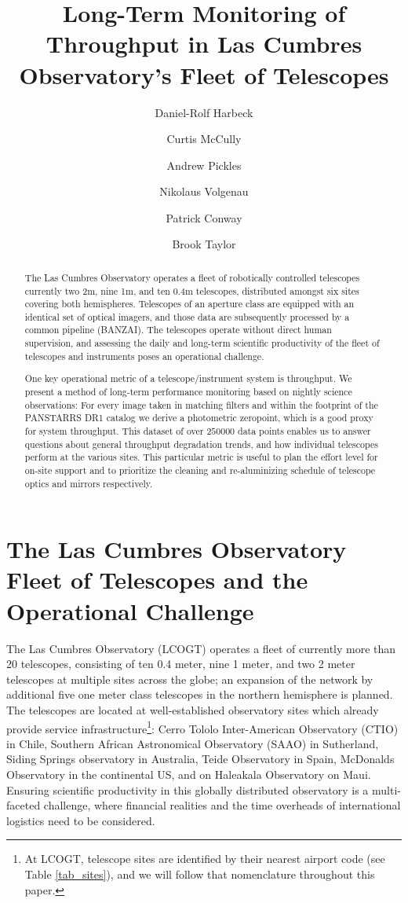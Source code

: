 \documentclass[]{spieman}
\title{Long-Term Monitoring of Throughput in Las Cumbres Observatory's Fleet of Telescopes}
\author[a]{Daniel-Rolf Harbeck}
\author[a]{Curtis McCully}
\author[a]{Andrew Pickles}
\author[a]{Nikolaus Volgenau}
\author[a]{Patrick Conway}
\author[a]{Brook Taylor}
\affil[a] {Las Cumbres Observatory, Goleta, CA (USA)}
\begin{document}
\maketitle

\begin{abstract}
The Las Cumbres Observatory operates a fleet of robotically controlled telescopes currently two 2m,
nine 1m, and ten 0.4m telescopes, distributed amongst six sites covering both hemispheres.
Telescopes of an aperture class are equipped with an identical set of optical imagers, and those
data are subsequently processed by a common pipeline (BANZAI). The telescopes operate without direct
human supervision, and assessing the daily and long-term scientific productivity of the fleet of
telescopes and instruments poses an operational challenge.

One key operational metric of a telescope/instrument system is throughput. We present a method of
long-term performance monitoring based on nightly science observations: For every image taken in
matching filters and within the footprint of the PANSTARRS DR1 catalog we derive a photometric
zeropoint, which is a good proxy for system throughput. This dataset of over $250000$ data points
enables us to answer questions about general throughput degradation trends, and how individual
telescopes perform at the various sites. This particular metric is useful to plan the effort level
for on-site support and to prioritize the cleaning and re-aluminizing schedule of telescope optics
and mirrors respectively.
\end{abstract}




\section{The Las Cumbres Observatory Fleet of Telescopes and the Operational Challenge}

The Las Cumbres Observatory (LCOGT) operates a fleet of currently more than 20 telescopes,
consisting of ten 0.4 meter, nine 1 meter, and two 2 meter telescopes at multiple sites across the
globe\cite{brown2013}; an expansion of the network by additional five one meter class telescopes in
the northern hemisphere is planned. The telescopes are located at well-established
observatory sites which already provide service infrastructure\footnote{At LCOGT, telescope sites
are identified by their nearest airport code (see Table \ref{tab_sites}), and we will follow that 
nomenclature throughout this paper.}: Cerro Tololo Inter-American
Observatory (CTIO) in Chile, Southern African Astronomical Observatory (SAAO) in Sutherland, Siding Springs
observatory in Australia, Teide Observatory in Spain, McDonalds Observatory in the continental US,
and on Haleakala Observatory on Maui. Ensuring scientific productivity in this globally distributed observatory
is a multi-faceted challenge, where financial realities and the time overheads of international logistics need 
to be considered. 
\end{document}
